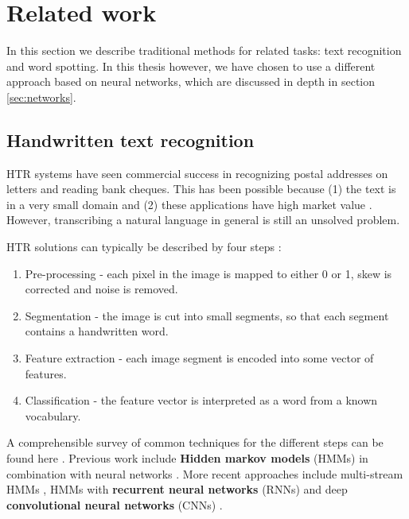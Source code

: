 
\section{Related work}

In this section we describe traditional methods for related tasks: text recognition and word spotting. In this thesis however, we have chosen to use a different approach based on neural networks, which are discussed in depth in section \ref{sec:networks}.


\subsection{Handwritten text recognition}

HTR systems have
seen commercial success in
recognizing postal addresses on letters \cite{lecun_1989, zipcode_system} and reading bank cheques. This has been possible because (1) the text is in a very small domain and (2) these applications have high market value \cite{40_years_HWR}. However, transcribing a natural language in general is still an unsolved problem.

HTR solutions can typically be described by four steps \cite{offline_HWR_CNN}:
\begin{enumerate}
    \item Pre-processing - each pixel in the image is mapped to either 0 or 1, skew is corrected and noise is removed.
    \item Segmentation - the image is cut into small segments, so that each segment contains a handwritten word.
    \item Feature extraction - each image segment is encoded into some vector of features.
    \item Classification - the feature vector is interpreted as a word from a known vocabulary.
\end{enumerate}

A comprehensible survey of common techniques for the different steps can be found here \cite{HWR_survey}.
Previous work include \textbf{Hidden markov models} (HMMs) in combination with neural networks \cite{Offline_HWR_HMM_ANN}.
More recent approaches include multi-stream HMMs \cite{HWR_multi_stream_HMM_arabic}, HMMs with \textbf{recurrent neural networks} (RNNs) \cite{Offline_HWR_RNN} and deep \textbf{convolutional neural networks} (CNNs) \cite{offline_HWR_CNN}.

